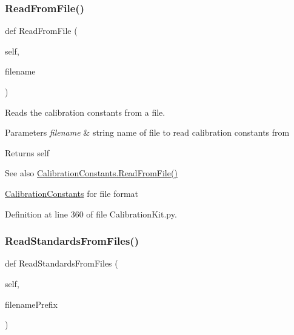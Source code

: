 \subsubsection{\texorpdfstring{Read\+From\+File()}{ReadFromFile()}}
{\footnotesize\ttfamily def Read\+From\+File (\begin{DoxyParamCaption}\item[{}]{self,  }\item[{}]{filename }\end{DoxyParamCaption})}



Reads the calibration constants from a file. 


\begin{DoxyParams}{Parameters}
{\em filename} & string name of file to read calibration constants from \\
\hline
\end{DoxyParams}
\begin{DoxyReturn}{Returns}
self 
\end{DoxyReturn}
\begin{DoxySeeAlso}{See also}
\hyperlink{classSignalIntegrity_1_1Measurement_1_1CalKit_1_1CalibrationKit_1_1CalibrationConstants_a3dc78f8134b7196685f6b0b5ace5e33b}{Calibration\+Constants.\+Read\+From\+File()} 

\hyperlink{classSignalIntegrity_1_1Measurement_1_1CalKit_1_1CalibrationKit_1_1CalibrationConstants}{Calibration\+Constants} for file format 
\end{DoxySeeAlso}


Definition at line 360 of file Calibration\+Kit.\+py.

\mbox{\label{classSignalIntegrity_1_1Measurement_1_1CalKit_1_1CalibrationKit_1_1CalibrationKit_a749305349102d6e6bfd1babeb152046f}} 
\subsubsection{\texorpdfstring{Read\+Standards\+From\+Files()}{ReadStandardsFromFiles()}}
{\footnotesize\ttfamily def Read\+Standards\+From\+Files (\begin{DoxyParamCaption}\item[{}]{self,  }\item[{}]{filename\+Prefix }\end{DoxyParamCaption})}



